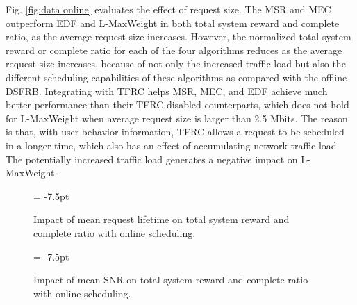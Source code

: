 \documentclass[journal,letterpaper,12pt,oneside,onecolumn,draftclsnofoot]{IEEEtran}
\begin{document}
Fig. \ref{fig:data online} evaluates the effect of request size.
The MSR and MEC outperform EDF and L-MaxWeight in both total system reward and complete ratio, as the average request size increases.
However, the normalized total system reward or complete ratio for each of the four algorithms reduces as the average request size increases, because of not only the increased traffic load but also the different scheduling capabilities of these algorithms as compared with the offline DSFRB.
Integrating with TFRC helps MSR, MEC, and EDF achieve much better performance than their TFRC-disabled counterparts, which does not hold for L-MaxWeight when average request size is larger than 2.5 Mbits.
The reason is that, with user behavior information, TFRC allows a request to be scheduled in a longer time, which also has an effect of accumulating network traffic load. The potentially increased traffic load generates a negative impact on L-MaxWeight.


\begin{figure*}[htp]
\subfigcapskip = -7.5pt
\centering
{}
\vspace{-0.3cm}
\caption{Impact of mean request lifetime on total system reward and complete ratio with online scheduling.}
\label{fig:lifetime_online}
\vspace{-0.55cm}
\end{figure*}

\begin{figure*}[tp]\subfigcapskip = -7.5pt
\centering
{}
\vspace{-0.3cm}
\caption{Impact of mean SNR on total system reward and complete ratio with online scheduling.}
\vspace{-0.85cm}
\label{fig:snr online}
\end{figure*}
\end{document}
